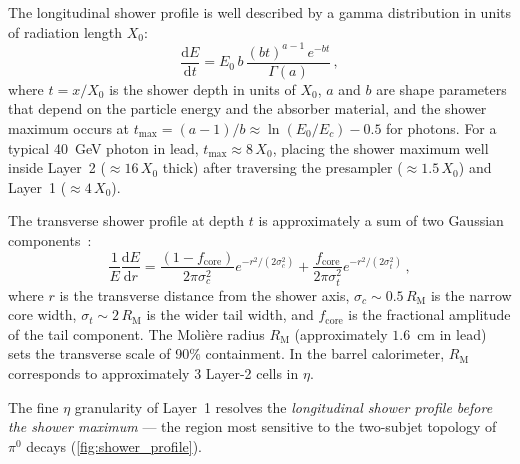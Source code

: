\documentclass[11pt,a4paper]{article}
\newcommand{\Xnaught}{X_0}
\newcommand{\RM}{R_\mathrm{M}^{\phantom{0}}}
\begin{document}
The longitudinal shower profile is well described by a gamma distribution
in units of radiation length $\Xnaught$:
\begin{equation}
  \frac{\mathrm{d}E}{\mathrm{d}t} = E_0\,b\,
    \frac{(bt)^{a-1}\,e^{-bt}}{\Gamma(a)}\,,
  \label{eq:shower:long}
\end{equation}
where $t = x/\Xnaught$ is the shower depth in units of $\Xnaught$,
$a$ and $b$ are shape parameters that depend on the particle energy
and the absorber material, and the shower maximum occurs at
$t_\mathrm{max} = (a-1)/b \approx \ln(E_0/E_c) - 0.5$ for photons.
For a typical 40~GeV photon in lead, $t_\mathrm{max} \approx 8\,\Xnaught$,
placing the shower maximum well inside Layer~2
($\approx 16\,\Xnaught$ thick) after traversing the presampler
($\approx 1.5\,\Xnaught$) and Layer~1 ($\approx 4\,\Xnaught$).

The transverse shower profile at depth $t$ is approximately a sum of
two Gaussian components~\cite{PDG:2024}:
\begin{equation}
  \frac{1}{E}\frac{\mathrm{d}E}{\mathrm{d}r} =
    \frac{(1-f_\mathrm{core})}{2\pi\sigma_c^2}
    e^{-r^2/(2\sigma_c^2)} +
    \frac{f_\mathrm{core}}{2\pi\sigma_t^2}
    e^{-r^2/(2\sigma_t^2)}\,,
  \label{eq:shower:trans}
\end{equation}
where $r$ is the transverse distance from the shower axis,
$\sigma_c \sim 0.5\,\RM$ is the narrow core width,
$\sigma_t \sim 2\,\RM$ is the wider tail width, and
$f_\mathrm{core}$ is the fractional amplitude of the tail component.
The Moli\`ere radius $\RM$ (approximately $1.6$~cm in lead) sets
the transverse scale of 90\% containment.
In the barrel calorimeter, $\RM$ corresponds to approximately 3 Layer-2
cells in $\eta$.

The fine $\eta$ granularity of Layer~1 resolves the \emph{longitudinal
shower profile before the shower maximum} — the region most
sensitive to the two-subjet topology of $\pi^0$ decays
(\cref{fig:shower_profile}).
\end{document}
